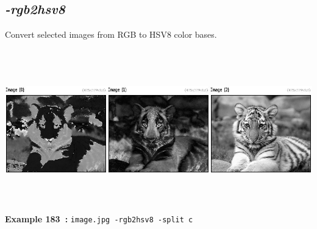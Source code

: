 \documentclass[a4paper,11pt,twoside]{book}
\begin{document}
\subsection{\emph{-rgb2hsv8} }\vspace*{-0.5em}
Convert selected images from RGB to HSV8 color bases.
\begin{center}\includegraphics[keepaspectratio=true,height=7cm,width=\textwidth]{img/gmic_def183.jpg}\\
{\footnotesize \textbf{Example 183~:} \texttt{image.jpg -rgb2hsv8 -split c}}
\end{center}
\end{document}

